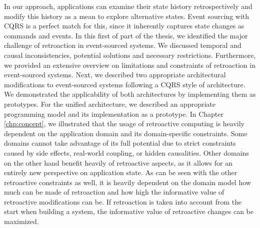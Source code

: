 In our approach, applications can examine their state history retrospectively 
and modify this history as a mean to explore alternative states. Event sourcing 
with CQRS is a perfect match for this, since it inherently captures state 
changes as commands and events. In this first of part of the thesis, we 
identified the major challenge of retroaction in event-sourced systems. 
We discussed temporal and causal inconsistencies, potential solutions and 
necessary restrictions. Furthermore, we provided an extensive overview on 
limitations and constraints of retroaction in event-sourced systems. Next, we 
described two appropriate architectural modifications to event-sourced systems 
following a CQRS style of architecture.
%
We demonstrated the applicability of both architectures by implementing them as 
prototypes. For the unified architecture, we described an appropriate programming 
model and its implementation as a prototype.
%
In Chapter \ref{chp:concept}, we illustrated that the usage of retroactive computing 
is heavily dependent on the application domain and its domain-specific constraints. 
Some domains cannot take advantage of its full potential due to strict constraints 
caused by side effects, real-world coupling, or hidden causalities. Other domains 
on the other hand benefit heavily of retroactive aspects, as it allows for an 
entirely new perspective on application state.
%
As can be seen with the other retroactive constraints as well, it is heavily 
dependent on the domain model how much can be made of retroaction and how
high the informative value of retroactive modifications can be.
If retroaction is taken into account from the start when building a system, the 
informative value of retroactive changes can be maximized.
